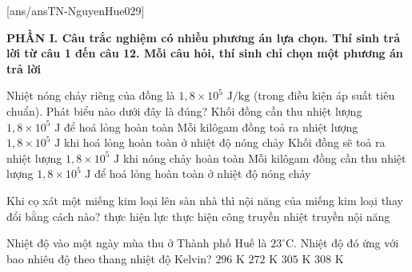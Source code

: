 [ans/ansTN-NguyenHue029]

\noindent \textbf{PHẦN I. Câu trắc nghiệm có nhiều phương án lựa chọn. Thí sinh trả lời từ câu 1 đến câu 12. Mỗi câu hỏi, thí sinh chỉ chọn một phương án trả lời}
\vspace{0.2cm}

\begin{ex}	Nhiệt nóng chảy riêng của đồng là $1,8 \times 10^{5}\text{ J/kg}$ (trong điều kiện áp suất tiêu chuẩn). Phát biểu nào dưới đây là đúng?
	\choice
	{Khối đồng cần thu nhiệt lượng $1,8 \times 10^{5}\text{ J}$ để hoá lỏng hoàn toàn}
	{Mỗi kilôgam đồng toả ra nhiệt lượng $1,8 \times 10^{5}\text{ J}$ khi hoá lỏng hoàn toàn ở nhiệt độ nóng chảy}
	{Khối đồng sẽ toả ra nhiệt lượng $1,8 \times 10^{5}\text{ J}$ khi nóng chảy hoàn toàn}
	{\True Mỗi kilôgam đồng cần thu nhiệt lượng $1,8 \times 10^{5}\text{ J}$ để hoá lỏng hoàn toàn ở nhiệt độ nóng chảy}
\end{ex}

\begin{ex}	Khi cọ xát một miếng kim loại lên sàn nhà thì nội năng của miếng kim loại thay đổi bằng cách nào?
	\choice
	{thực hiện lực}
	{\True thực hiện công}
	{truyền nhiệt}
	{truyền nội năng}
\end{ex}

\begin{ex}	Nhiệt độ vào một ngày mùa thu ở Thành phố Huế là $23^\circ\text{C}$. Nhiệt độ đó ứng với bao nhiêu độ theo thang nhiệt độ Kelvin?
	\choice
	{\True $296\text{ K}$}
	{$272\text{ K}$}
	{$305\text{ K}$}
	{$308\text{ K}$}
\end{ex}

